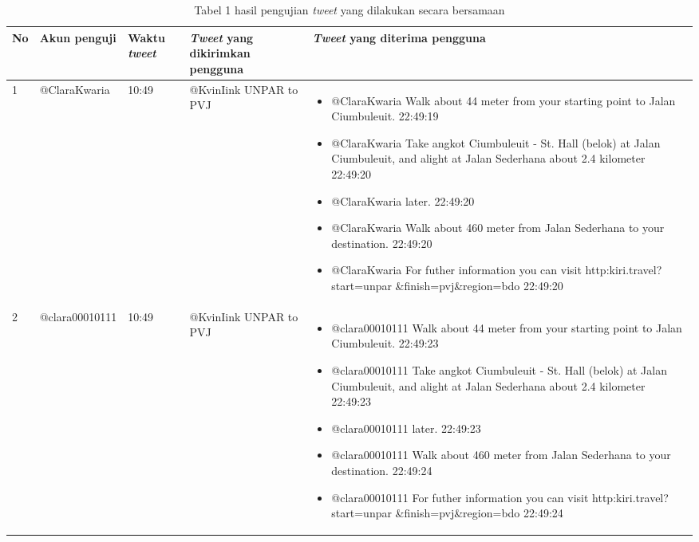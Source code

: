 \begin{enumerate}
	\begin{table}[h]
	\caption{Tabel 1 hasil pengujian \textit{tweet} yang dilakukan secara bersamaan}
	\label{tab:tabelHasilPengujianTweetYangDilakukanSecaraBersamaan}
		\begin{tabular}{|p{0.5cm}|p{2.5cm}|p{1.5cm}|p{4cm}|p{6cm}|}
			\hline
				No & Akun penguji & Waktu \textit{tweet} & \textit{Tweet} yang dikirimkan pengguna & \textit{Tweet} yang diterima pengguna \\ \hline
				1 & @ClaraKwaria & 10:49 &  @KvinIink UNPAR to PVJ & 
				\begin{itemize}
					\item @ClaraKwaria Walk about 44 meter from your starting point to Jalan Ciumbuleuit. 22:49:19
					\item @ClaraKwaria Take angkot Ciumbuleuit - St. Hall (belok) at Jalan Ciumbuleuit, and alight at Jalan Sederhana about 2.4 kilometer 22:49:20
					\item @ClaraKwaria later. 22:49:20
					\item @ClaraKwaria Walk about 460 meter from Jalan Sederhana to your destination. 22:49:20
					\item @ClaraKwaria For futher information you can visit http:\/\/kiri.travel?start=unpar \&finish=pvj\&region=bdo 22:49:20
				\end{itemize} \\ \hline
				2 & @clara00010111 & 10:49 &  @KvinIink UNPAR to PVJ &
				\begin{itemize}
					\item @clara00010111 Walk about 44 meter from your starting point to Jalan Ciumbuleuit. 22:49:23 
					\item @clara00010111 Take angkot Ciumbuleuit - St. Hall (belok) at Jalan Ciumbuleuit, and alight at Jalan Sederhana about 2.4 kilometer 22:49:23
					\item @clara00010111 later. 22:49:23
					\item @clara00010111 Walk about 460 meter from Jalan Sederhana to your destination. 22:49:24
					\item @clara00010111 For futher information you can visit http:\/\/kiri.travel?start=unpar \&finish=pvj\&region=bdo 22:49:24
				\end{itemize} \\ \hline
		\end{tabular}
\end{table}


\end{enumerate}
